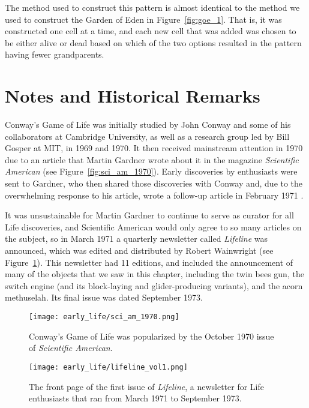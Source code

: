 The method used to construct this pattern is almost identical to the method we used to construct the Garden of Eden in Figure~\ref{fig:goe_1}. That is, it was constructed one cell at a time, and each new cell that was added was chosen to be either alive or dead based on which of the two options resulted in the pattern having fewer grandparents.


\section{Notes and Historical Remarks}\label{sec:early_life_notes}

Conway's Game of Life was initially studied by John Conway and some of his collaborators at Cambridge University, as well as a research group led by Bill Gosper at MIT, in 1969 and 1970. It then received mainstream attention in 1970 due to an article that Martin Gardner wrote about it in the magazine \emph{Scientific American} \cite{Gar70} (see Figure~\ref{fig:sci_am_1970}). Early discoveries by enthusiasts were sent to Gardner, who then shared those discoveries with Conway and, due to the overwhelming response to his article, wrote a follow-up article in February 1971 \cite{Gar71}.

It was unsustainable for Martin Gardner to continue to serve as curator for all Life discoveries, and Scientific American would only agree to so many articles on the subject, so in March 1971 a quarterly newsletter called \emph{Lifeline} was announced, which was edited and distributed by Robert Wainwright (see Figure~\ref{fig:lifeline}). This newsletter had 11 editions, and included the announcement of many of the objects that we saw in this chapter, including the twin bees gun, the switch engine (and its block-laying and glider-producing variants), and the acorn methuselah. Its final issue was dated September 1973.

\begin{figure}[!htb]
	\centering
	\begin{minipage}[b]{0.48\textwidth}
		\centering\texttt{[image: early\_life/sci\_am\_1970.png]}
		\caption{Conway's Game of Life was popularized by the October 1970 issue of \emph{Scientific American}.}\label{fig:sci_am_1970}
	\end{minipage}\hfill
	\begin{minipage}[b]{0.48\textwidth}
		\centering\texttt{[image: early\_life/lifeline\_vol1.png]}
		\caption{The front page of the first issue of \emph{Lifeline}, a newsletter for Life enthusiasts that ran from March 1971 to September 1973.}\label{fig:lifeline}
	\end{minipage}
\end{figure}

